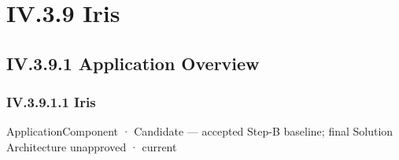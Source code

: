 \section*{IV.3.9 Iris}
\label{navigation:IV.3.9}

\subsection*{IV.3.9.1 Application Overview}
\label{navigation:IV.3.9.1}

\subsubsection*{IV.3.9.1.1 Iris}
\label{navigation:IV.3.9.1.1}

\label{element:e927c1af96c64fcd979be659bee2cbe3}
{\small ApplicationComponent · Candidate — accepted Step-B baseline; final Solution Architecture unapproved · current}\par

